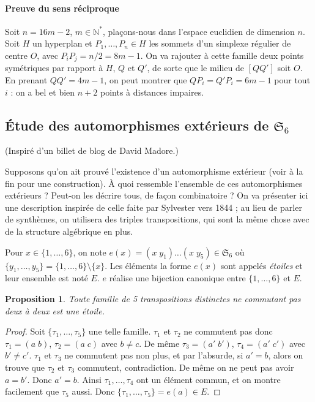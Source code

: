 \documentclass[a4paper, 11pt]{article}
\def\N{\mathbb{N}}
\def\Sigmap{\mathfrak{S}}
\newtheorem*{proposition}{Proposition}
\begin{document}
\paragraph{Preuve du sens réciproque}

Soit $n = 16m - 2$, $m \in \N^*$, plaçons-nous dans l'espace euclidien de
dimension $n$. Soit $H$ un hyperplan et $P_1, \ldots, P_n \in H$ les sommets
d'un simplexe régulier de centre $O$, avec $P_iP_j = n/2 = 8m-1$. On va rajouter
à cette famille deux points symétriques par rapport à $H$, $Q$ et $Q'$, de sorte
que le milieu de $[QQ']$ soit $O$. En prenant $QQ' = 4m - 1$, on peut montrer
que $QP_i = Q'P_i = 6m - 1$ pour tout $i$ : on a bel et bien $n+2$ points à
distances impaires.


\newpage


\subsection{Étude des automorphismes extérieurs de $\Sigmap_6$}
\label{s6}

(Inspiré d'un billet de blog de David Madore.)

Supposons qu'on ait prouvé l'existence d'un automorphisme extérieur (voir à la
fin pour une construction). À quoi ressemble l'ensemble de ces automorphismes
extérieurs ? Peut-on les décrire tous, de façon combinatoire ? On va présenter
ici une description inspirée de celle faite par Sylvester vers 1844 ; au lieu de
parler de synthèmes, on utilisera des triples transpositions, qui sont la même
chose avec de la structure algébrique en plus.

Pour $x \in \{1, \ldots, 6\}$, on note $e(x) = (x\;y_1)\ldots(x\;y_5) \in
\Sigmap_6$ où $\{ y_1, \ldots, y_5 \} = \{1, \ldots, 6\}\setminus\{x\}$. Les
éléments la forme $e(x)$ sont appelés \emph{étoiles} et leur ensemble est noté
$E$. $e$ réalise une bijection canonique entre $\{1, \ldots, 6\}$ et $E$.

\begin{proposition}
  Toute famille de 5 transpositions distinctes ne commutant pas deux à deux est
  une étoile.
\end{proposition}
\begin{proof}
  Soit $\{\tau_1, \ldots, \tau_5\}$ une telle famille. $\tau_1$ et $\tau_2$ ne
  commutent pas donc $\tau_1 = (a\;b)$, $\tau_2 = (a\;c)$ avec $b \neq c$. De
  même $\tau_3 = (a'\;b')$, $\tau_4 = (a'\;c')$ avec $b' \neq c'$. $\tau_1$ et
  $\tau_3$ ne commutent pas non plus, et par l'absurde, si $a' = b$, alors on
  trouve que $\tau_2$ et $\tau_3$ commutent, contradiction. De même on ne peut
  pas avoir $a = b'$. Donc $a' = b$. Ainsi $\tau_1, \ldots, \tau_4$ ont un
  élément commun, et on montre facilement que $\tau_5$ aussi. Donc $\{\tau_1,
  \ldots, \tau_5\} = e(a) \in E$.
\end{proof}
\end{document}
